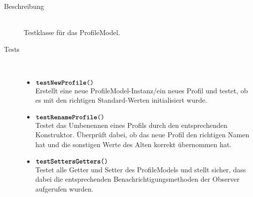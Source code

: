 \begin{description}
\item[Beschreibung] \hfill \\ Testklasse für das ProfileModel.

\item[Tests] \hfill \\
	\vspace{-.8cm}
	\begin{itemize}
		\item $\texttt{\textbf{testNewProfile}()}$ \\ Erstellt eine neue ProfileModel-Instanz/ein neues Profil und testet, ob es mit den richtigen Standard-Werten initialisiert wurde.
		\item $\texttt{\textbf{testRenameProfile}()}$ \\ Testet das Umbenennen eines Profils durch den entsprechenden Konstruktor. Überprüft dabei, ob das neue Profil den richtigen Namen hat und die sonstigen Werte des Alten korrekt übernommen hat. 
		\item $\texttt{\textbf{testSettersGetters}()}$ \\ Testet alle Getter und Setter des ProfileModels und stellt sicher, dass dabei die entsprechenden Benachrichtigungsmethoden der Observer aufgerufen wurden.
	\end{itemize}
\end{description}